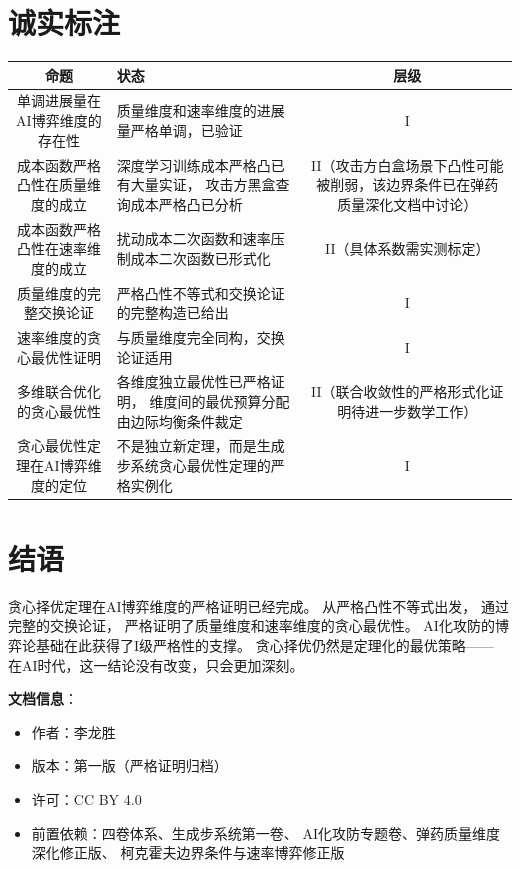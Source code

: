 \documentclass[11pt,a4paper]{article}
\begin{document}
\section{诚实标注}

\begin{center}
\begin{xltabular}{\textwidth}{c|X|c}
\toprule
\textbf{命题} & \textbf{状态} & \textbf{层级} \\
\midrule
单调进展量在AI博弈维度的存在性 &
质量维度和速率维度的进展量严格单调，已验证 &
I \\
成本函数严格凸性在质量维度的成立 &
深度学习训练成本严格凸已有大量实证，
攻击方黑盒查询成本严格凸已分析 &
II（攻击方白盒场景下凸性可能被削弱，该边界条件已在弹药质量深化文档中讨论） \\
成本函数严格凸性在速率维度的成立 &
扰动成本二次函数和速率压制成本二次函数已形式化 &
II（具体系数需实测标定） \\
质量维度的完整交换论证 &
严格凸性不等式和交换论证的完整构造已给出 &
I \\
速率维度的贪心最优性证明 &
与质量维度完全同构，交换论证适用 &
I \\
多维联合优化的贪心最优性 &
各维度独立最优性已严格证明，
维度间的最优预算分配由边际均衡条件裁定 &
II（联合收敛性的严格形式化证明待进一步数学工作） \\
贪心最优性定理在AI博弈维度的定位 &
不是独立新定理，而是生成步系统贪心最优性定理的严格实例化 &
I \\
\bottomrule
\end{xltabular}
\end{center}

\section{结语}

贪心择优定理在AI博弈维度的严格证明已经完成。
从严格凸性不等式出发，
通过完整的交换论证，
严格证明了质量维度和速率维度的贪心最优性。
AI化攻防的博弈论基础在此获得了I级严格性的支撑。
贪心择优仍然是定理化的最优策略——
在AI时代，这一结论没有改变，只会更加深刻。

\vspace{5mm}
\noindent\textbf{文档信息}：
\begin{itemize}
    \item 作者：李龙胜
    \item 版本：第一版（严格证明归档）
    \item 许可：CC BY 4.0
    \item 前置依赖：四卷体系、生成步系统第一卷、
          AI化攻防专题卷、弹药质量维度深化修正版、
          柯克霍夫边界条件与速率博弈修正版
\end{itemize}
\end{document}

